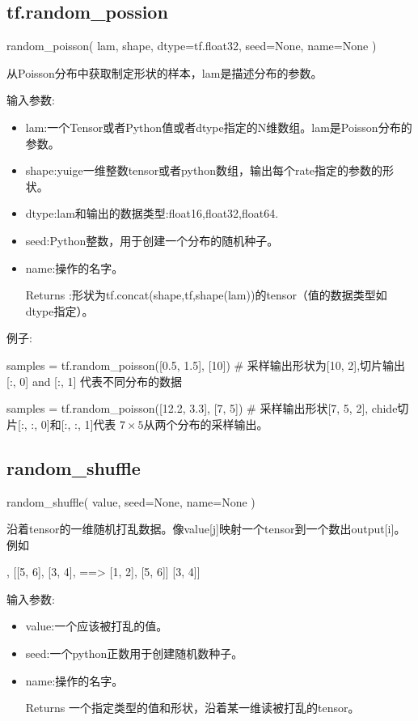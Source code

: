 \subsection{tf.random\_possion}
\begin{python}
random_poisson(
    lam,
    shape,
    dtype=tf.float32,
    seed=None,
    name=None
)
\end{python}
从Poisson分布中获取制定形状的样本，lam是描述分布的参数。

输入参数:
\begin{itemize}
\item lam:一个Tensor或者Python值或者dtype指定的N维数组。lam是Poisson分布的参数。
\item shape:yuige一维整数tensor或者python数组，输出每个rate指定的参数的形状。
\item dtype:lam和输出的数据类型:float16,float32,float64.
\item seed:Python整数，用于创建一个分布的随机种子。
\item name:操作的名字。
\item[Returns]:形状为tf.concat(shape,tf,shape(lam))的tensor（值的数据类型如dtype指定）。
\end{itemize}
例子:
\begin{python}
samples = tf.random_poisson([0.5, 1.5], [10]) # 采样输出形状为[10, 2],切片输出 [:, 0] and [:, 1] 代表不同分布的数据

samples = tf.random_poisson([12.2, 3.3], [7, 5]) # 采样输出形状[7, 5, 2], chide切片[:, :, 0]和[:, :, 1]代表 $7\times5$从两个分布的采样输出。
\end{python}
\subsection{random\_shuffle}
\begin{python}
random_shuffle(
    value,
    seed=None,
    name=None
)
\end{python}
沿着tensor的一维随机打乱数据。像value[j]映射一个tensor到一个数出output[i]。例如
\begin{python}
[[1, 2],       [[5, 6],
 [3, 4],  ==>   [1, 2],
 [5, 6]]        [3, 4]]
\end{python}
输入参数:
\begin{itemize}
\item value:一个应该被打乱的值。
\item seed:一个python正数用于创建随机数种子。
\item name:操作的名字。
\item[Returns] 一个指定类型的值和形状，沿着某一维读被打乱的tensor。
\end{itemize}
